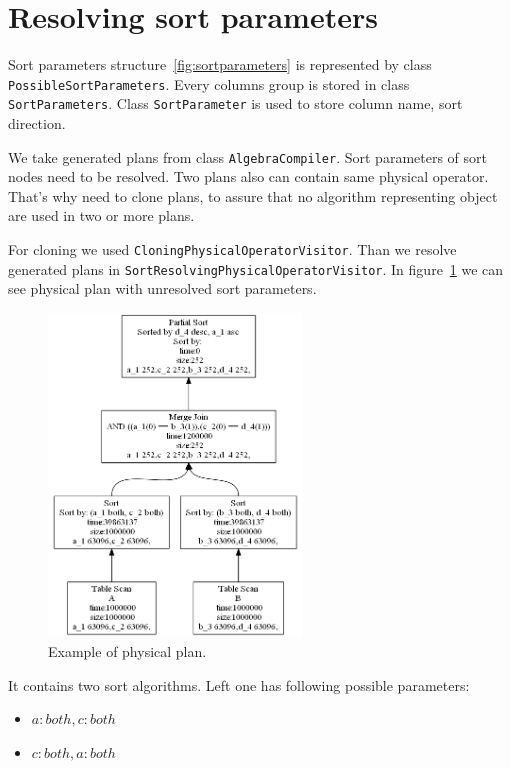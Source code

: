 \section{Resolving sort parameters}

Sort parameters structure~\ref{fig:sortparameters} is represented by class \texttt{PossibleSortParameters}. Every columns group is stored in class \texttt{SortParameters}. Class \texttt{SortParameter} is used to store column name, sort direction.


We take generated plans from class \texttt{AlgebraCompiler}. Sort parameters of sort nodes need to be resolved. Two plans also can contain same physical operator. That's why need to clone plans, to assure that no algorithm representing object are used in two or more plans.

For cloning we used \texttt{CloningPhysicalOperatorVisitor}. Than we resolve generated plans in \texttt{SortResolvingPhysicalOperatorVisitor}. In figure~\ref{fig:plansortunresolved} we can see physical plan with unresolved sort parameters. 

\begin{figure}[h!]
  \centering
    \includegraphics[width=0.6\textwidth]{plansortunresolved}

      \caption{Example of physical plan.}
          \label{fig:plansortunresolved}
\end{figure}

It contains two sort algorithms. Left one has following possible parameters:

\begin{itemize}
\item $a:both, c:both$
\item $c:both, a:both$
\end{itemize}

